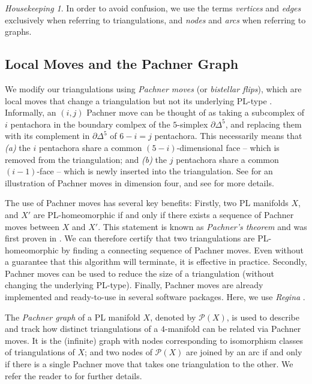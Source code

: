 \documentclass[pdflatex,sn-mathphys-num]{sn-jnl}
\theoremstyle{thmstyleone}%
\theoremstyle{thmstyletwo}%
\theoremstyle{thmstylethree}%
\theoremstyle{remark}
\newtheorem{housekeeping}{Housekeeping}
\begin{document}
\begin{housekeeping}
In order to avoid confusion, we use the terms \emph{vertices} and \emph{edges} exclusively when referring to triangulations, and \emph{nodes} and \emph{arcs} when referring to graphs.         
\end{housekeeping}

\subsection{Local Moves and the Pachner Graph}\label{sec:prelims-localMoves}
We modify our triangulations using \emph{Pachner moves} (or \emph{bistellar flips}), which are local moves that change a triangulation but not its underlying PL-type \cite{pachner1987}. Informally, an $(i,j)$ Pachner move can be thought of as taking a subcomplex of $i$ pentachora in the boundary comlpex of the $5$-simplex $\partial \Delta^5$, and replacing them with its complement in $\partial \Delta^5$ of $6-i = j$ pentachora. This necessarily means that {\em (a)} the $i$ pentachora share a common $(5-i)$-dimensional face -- which is removed from the triangulation; and {\em (b)} the $j$ pentachora share a common $(i-1)$-face -- which is newly inserted into the triangulation. See  for an illustration of Pachner moves in dimension four, and see \cite{pachner1987} for more details.

The use of Pachner moves has several key benefits: Firstly, two PL manifolds $X$, and $X'$ are PL-homeomorphic if and only if there exists a sequence of Pachner moves between $X$ and $X'$. This statement is known as {\em Pachner's theorem} and was first proven in \cite{pachner1987}. We can therefore certify that two triangulations are PL-homeomorphic by finding a connecting sequence of Pachner moves. Even without a guarantee that this algorithm will terminate, it is effective in practice. Secondly, Pachner moves can be used to reduce the size of a triangulation (without changing the underlying PL-type). Finally, Pachner moves are already implemented and ready-to-use in several software packages. Here, we use \emph{Regina} \cite{Regina}.
    
The \emph{Pachner graph} of a PL manifold $X$, denoted by $\mathscr{P}(X)$, is used to describe and track how distinct triangulations of a $4$-manifold can be related via Pachner moves. It is the (infinite) graph with nodes corresponding to isomorphism classes of triangulations of $X$; and two nodes of $\mathscr{P}(X)$ are joined by an arc if and only if there is a single Pachner move that takes one triangulation to the other. We refer the reader to \cite{burton2011pachner} for further details.
\end{document}
